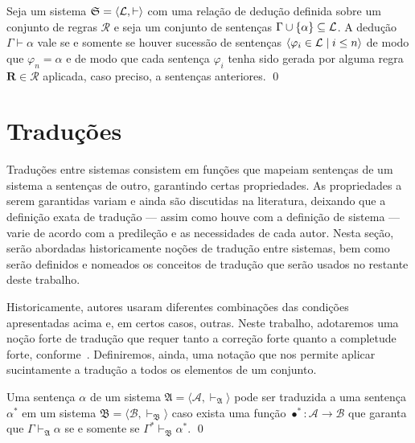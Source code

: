 \begin{tcolorbox}[enhanced jigsaw, breakable, sharp corners, colframe=black, colback=white, boxrule=0.5pt, left=1.5mm, right=1.5mm, top=1.5mm, bottom=1.5mm]
\begin{definition}[Dedução]
    Seja um sistema $\mathfrak{S} = \langle\mathcal{L},{\vdash}\rangle$ com uma relação de dedução definida sobre um conjunto de regras $\mathcal{R}$ e seja um conjunto de sentenças $\Gamma\cup\left\{\alpha\right\}\subseteq\mathcal{L}$.
    A dedução $\Gamma\vdash\alpha$ vale se e somente se houver sucessão de sentenças $\langle\varphi_i\in\mathcal{L}\mid i\leq n\rangle$ de modo que $\varphi_n=\alpha$ e de modo que cada sentença $\varphi_i$ tenha sido gerada por alguma regra $\mathbf{R}\in\mathcal{R}$ aplicada, caso preciso, a sentenças anteriores.
    \qed{}
\end{definition}
\end{tcolorbox}

\section{Traduções}

Traduções entre sistemas consistem em funções que mapeiam sentenças de um sistema a sentenças de outro, garantindo certas propriedades. As propriedades a serem garantidas variam e ainda são discutidas na literatura, deixando que a definição exata de tradução --- assim como houve com a definição de sistema --- varie de acordo com a predileção e as necessidades de cada autor. Nesta seção, serão abordadas historicamente noções de tradução entre sistemas, bem como serão definidos e nomeados os conceitos de tradução que serão usados no restante deste trabalho.

Historicamente, autores usaram diferentes combinações das condições apresentadas acima e, em certos casos, outras. Neste trabalho, adotaremos uma noção forte de tradução que requer tanto a correção forte quanto a completude forte, conforme~\cite{Coniglio}. Definiremos, ainda, uma notação que nos permite aplicar sucintamente a tradução a todos os elementos de um conjunto.

\begin{tcolorbox}[enhanced jigsaw, breakable, sharp corners, colframe=black, colback=white, boxrule=0.5pt, left=1.5mm, right=1.5mm, top=1.5mm, bottom=1.5mm]
\begin{definition}[Tradução] 
    Uma sentença $\alpha$ de um sistema $\mathfrak{A} = \langle\mathcal{A}, \vdash_\mathfrak{A}\rangle$ pode ser traduzida a uma sentença $\alpha^*$ em um sistema $\mathfrak{B} = \langle\mathcal{B}, \vdash_\mathfrak{B} \rangle$ caso exista uma função $\bullet^* : \mathcal{A} \to \mathcal{B}$ que garanta que $\Gamma\vdash_\mathfrak{A}\alpha$ se e somente se $\Gamma^*\vdash_\mathfrak{B}\alpha^*$.
    \qed{}
\end{definition}
\end{tcolorbox}

